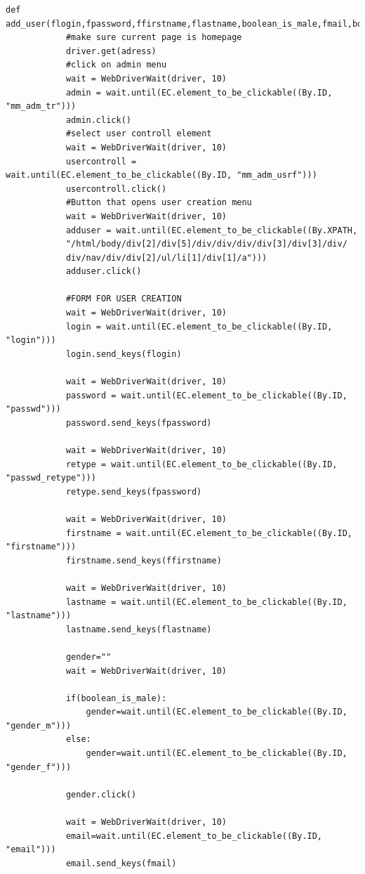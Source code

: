 \documentclass[10pt, a4paper,onecolumn ,titlepage]{article}
\begin{document}
\begin{lstlisting}[label={lst:SeleniumSkript}]
        def add_user(flogin,fpassword,ffirstname,flastname,boolean_is_male,fmail,boolean_is_admin):
            #make sure current page is homepage
            driver.get(adress)
            #click on admin menu
            wait = WebDriverWait(driver, 10)
            admin = wait.until(EC.element_to_be_clickable((By.ID, "mm_adm_tr")))
            admin.click()
            #select user controll element
            wait = WebDriverWait(driver, 10)
            usercontroll = wait.until(EC.element_to_be_clickable((By.ID, "mm_adm_usrf")))
            usercontroll.click()
            #Button that opens user creation menu
            wait = WebDriverWait(driver, 10)
            adduser = wait.until(EC.element_to_be_clickable((By.XPATH,
            "/html/body/div[2]/div[5]/div/div/div/div[3]/div[3]/div/
            div/nav/div/div[2]/ul/li[1]/div[1]/a")))
            adduser.click()

            #FORM FOR USER CREATION
            wait = WebDriverWait(driver, 10)
            login = wait.until(EC.element_to_be_clickable((By.ID, "login")))
            login.send_keys(flogin)

            wait = WebDriverWait(driver, 10)
            password = wait.until(EC.element_to_be_clickable((By.ID, "passwd")))
            password.send_keys(fpassword)

            wait = WebDriverWait(driver, 10)
            retype = wait.until(EC.element_to_be_clickable((By.ID, "passwd_retype")))
            retype.send_keys(fpassword)

            wait = WebDriverWait(driver, 10)
            firstname = wait.until(EC.element_to_be_clickable((By.ID, "firstname")))
            firstname.send_keys(ffirstname)

            wait = WebDriverWait(driver, 10)
            lastname = wait.until(EC.element_to_be_clickable((By.ID, "lastname")))
            lastname.send_keys(flastname)

            gender=""
            wait = WebDriverWait(driver, 10)

            if(boolean_is_male):
                gender=wait.until(EC.element_to_be_clickable((By.ID, "gender_m")))
            else:
                gender=wait.until(EC.element_to_be_clickable((By.ID, "gender_f")))

            gender.click()

            wait = WebDriverWait(driver, 10)
            email=wait.until(EC.element_to_be_clickable((By.ID, "email")))
            email.send_keys(fmail)


\end{lstlisting}
\end{document}

